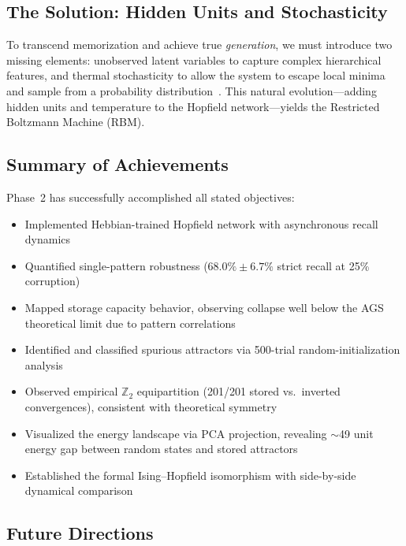 \documentclass[11pt,a4paper,twocolumn]{article}
\newcommand{\Z}{\mathbb{Z}}
\begin{document}
\subsection{The Solution: Hidden Units and Stochasticity}
\label{sec:solution_rbm}

To transcend memorization and achieve true \emph{generation}, we must
introduce two missing elements: unobserved latent variables to capture complex
hierarchical features, and thermal stochasticity to allow the system to escape
local minima and sample from a probability
distribution~\cite{ackley1985,hinton2006}. This natural evolution---adding
hidden units and temperature to the Hopfield network---yields the Restricted
Boltzmann Machine (RBM).

\subsection{Summary of Achievements}
\label{sec:summary}

Phase~2 has successfully accomplished all stated objectives:
\begin{itemize}
    \item[$\checkmark$] Implemented Hebbian-trained Hopfield network with
    asynchronous recall dynamics
    \item[$\checkmark$] Quantified single-pattern robustness ($68.0\% \pm
    6.7\%$ strict recall at 25\% corruption)
    \item[$\checkmark$] Mapped storage capacity behavior, observing collapse
    well below the AGS theoretical limit due to pattern correlations
    \item[$\checkmark$] Identified and classified spurious attractors via
    500-trial random-initialization analysis
    \item[$\checkmark$] Observed empirical $\Z_2$ equipartition (201/201
    stored vs.\ inverted convergences), consistent with theoretical symmetry
    \item[$\checkmark$] Visualized the energy landscape via PCA projection,
    revealing $\sim$49 unit energy gap between random states and stored
    attractors
    \item[$\checkmark$] Established the formal Ising--Hopfield isomorphism
    with side-by-side dynamical comparison
\end{itemize}

\subsection{Future Directions}
\label{sec:future}
\end{document}

